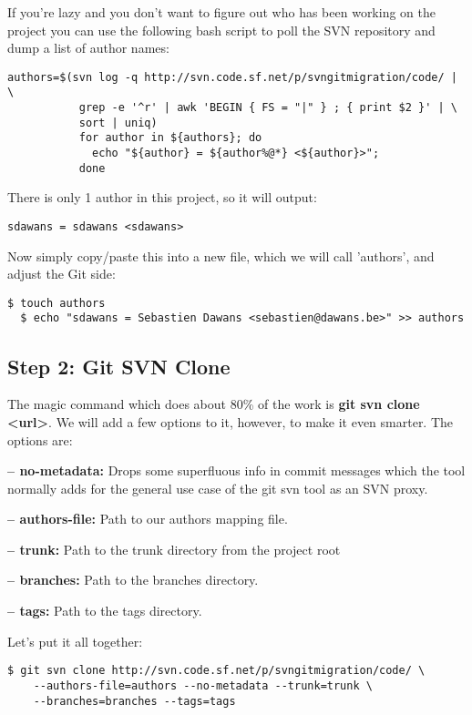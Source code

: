 \documentclass{../../common/tufte-latex/tufte-handout}
\begin{document}
If you're lazy and you don't want to figure out who has been working on the project you can use the following bash script to poll the SVN repository and dump a list of author names:

\begin{lstlisting}[style=BashInputStyle]
authors=$(svn log -q http://svn.code.sf.net/p/svngitmigration/code/ | \ 
           grep -e '^r' | awk 'BEGIN { FS = "|" } ; { print $2 }' | \
           sort | uniq)
           for author in ${authors}; do
             echo "${author} = ${author%@*} <${author}>";
           done
\end{lstlisting}

There is only 1 author in this project, so it will output:

\begin{lstlisting}[style=BashInputStyle]
  sdawans = sdawans <sdawans>
\end{lstlisting}

Now simply copy/paste this into a new file, which we will call 'authors', and adjust the Git side:

\begin{lstlisting}[style=BashInputStyle]
  $ touch authors
  $ echo "sdawans = Sebastien Dawans <sebastien@dawans.be>" >> authors
\end{lstlisting}

\subsection{Step 2: Git SVN Clone}
The magic command which does about 80\% of the work is \textbf{git svn clone <url>}.
We will add a few options to it, however, to make it even smarter.
The options are:

\noindent \textbf{-- no-metadata:} Drops some superfluous info in commit messages which the tool normally adds for the general use case of the git svn tool as an SVN proxy.

\noindent \textbf{-- authors-file:} Path to our authors mapping file.

\noindent \textbf{-- trunk:} Path to the trunk directory from the project root

\noindent \textbf{-- branches:} Path to the branches directory.

\noindent \textbf{-- tags:} Path to the tags directory.

\noindent Let's put it all together:

\begin{lstlisting}[style=BashInputStyle]
  $ git svn clone http://svn.code.sf.net/p/svngitmigration/code/ \
    --authors-file=authors --no-metadata --trunk=trunk \ 
    --branches=branches --tags=tags
\end{lstlisting}
\end{document}
